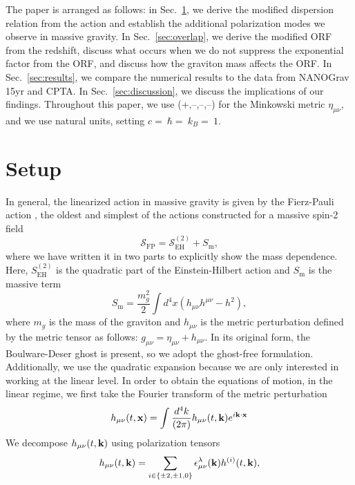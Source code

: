\documentclass[prd,aps,psfig,nofootinbib,nobibnotes,superscriptaddress,preprintnumbers,times]{revtex4-2}\setlength{\topmargin}{-14mm}
\begin{document}
The paper is arranged as follows: in Sec.\ \ref{sec:setup}, we derive the modified dispersion relation from the action and establish the additional polarization modes we observe in massive gravity. In Sec.\ \ref{sec:overlap}, we derive the modified ORF from the redshift, discuss what occurs when we do not suppress the exponential factor from the ORF, and discuss how the graviton mass affects the ORF. In Sec.\ \ref{sec:results}, we compare the numerical results to the data from NANOGrav 15yr and CPTA. In Sec.\ \ref{sec:discussion}, we discuss the implications of our findings. Throughout this paper, we use  (+,--,--,--) for the Minkowski metric $\eta_{\mu\nu}$, and we use natural units, setting $c = $$\ \hbar = $$\ k_B = $$\ 1$. 

\section{Setup}\label{sec:setup}
In general, the linearized action in massive gravity is given by the Fierz-Pauli action \cite{Fierz:1939ix}, the oldest and simplest of the actions constructed for a massive spin-2 field
\begin{equation}\label{eqn:action}
    \mathcal{S}_{\text{FP}} = \mathcal{S}_{\text{EH}}^{(2)} + S_{\text{m}},
\end{equation}
where we have written it in two parts to explicitly show the mass dependence. Here, $S_{\text{EH}}^{(2)}$ is the quadratic part of the Einstein-Hilbert action and $S_{\text{m}}$ is the massive term
\begin{equation} \label{eqn:action_m}
    S_{\text{m}} = \frac{m_g^2}{2}\int d^4x (h_{\mu\nu}h^{\mu\nu} - h^2),
\end{equation} 
where $m_{g}$ is the mass of the graviton and $h_{\mu\nu}$ is the metric perturbation defined by the metric tensor as follows: $g_{\mu\nu} = \eta_{\mu\nu} + h_{\mu\nu}$. In its original form, the Boulware-Deser ghost is present, so we adopt the ghost-free formulation. Additionally, we use the quadratic expansion because we are only interested in working at the linear level. In order to obtain the equations of motion, in the linear regime, we first take the Fourier transform of the metric perturbation 
\begin{equation}\label{eqn:fourier}
    h_{\mu\nu}(t, {\bf x}) = \int \frac{d^4 k}{(2\pi)}h_{\mu\nu}(t, {\bf k})e^{i{\bf k}\cdot{\bf x}}
\end{equation}
We decompose $h_{\mu\nu}(t, {\bf k}) $ using polarization tensors
\begin{equation}\label{eqn:decomp}
    h_{\mu\nu}(t, {\bf k}) = \sum_{i \in \{\pm 2, \pm 1,0\} } \epsilon^\lambda_{\mu\nu}({\bf k})h^{(i)}(t, {\bf k}),
\end{equation}
\end{document}
